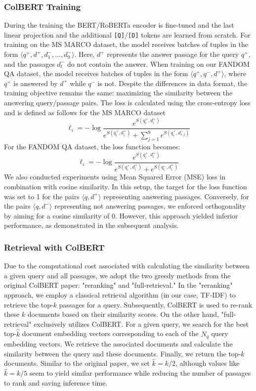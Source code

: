 \documentclass{article}
\begin{document}
\subsubsection{ColBERT Training}
During the training the BERT/RoBERTa encoder is fine-tuned and the last linear projection and the additional \texttt{[Q]}/\texttt{[D]} tokens are learned from scratch. For training on the MS MARCO dataset, the model receives batches of tuples in the form $\langle q^+, d^+, d_1^-, \dots, d_{9}^-\rangle$. Here, $d^+$ represents the answer passage for the query $q^+$, and the passages $d_l^-$ do not contain the answer. When training on our FANDOM QA dataset, the model receives batches of tuples in the form $\langle q^+, q^-, d^+\rangle$, where $q^+$ is answered by $d^+$ while $q^-$ is not. Despite the differences in data format, the training objective remains the same: maximizing the similarity between the answering query/passage pairs. The loss is calculated using the cross-entropy loss and is defined as follows for the MS MARCO dataset
$$
\ell_i = -\log \frac{e^{S(q_i^+, d_i^+)}}{e^{S(q_i^+, d_i^+)} + \sum_{j=1}^{9}{e^{S(q_i^+, d_{i, j}^-)}}}
$$
For the FANDOM QA dataset, the loss function becomes:
$$
\ell_i = -\log \frac{e^{S(q_i^+, d_i^+)}}{e^{S(q_i^+, d_i^+)} + e^{S(q_i^-, d_i^+)}}
$$
We also conducted experiments using Mean Squared Error (MSE) loss in combination with cosine similarity. In this setup, the target for the loss function was set to 1 for the pairs $\langle q, d^+\rangle$ representing answering passages. Conversely, for the pairs $\langle q, d^-\rangle$ representing not answering passages, we enforced orthogonality by aiming for a cosine similarity of 0. However, this approach yielded inferior performance, as demonstrated in the subsequent analysis.


\subsubsection{Retrieval with ColBERT}
Due to the computational cost associated with calculating the similarity between a given query and all passages, we adopt the two greedy methods from the original ColBERT paper: "reranking" and "full-retrieval." In the "reranking" approach, we employ a classical retrieval algorithm (in our case, TF-IDF) to retrieve the top-$k$ passages for a query. Subsequently, ColBERT is used to re-rank these $k$ documents based on their similarity scores. On the other hand, "full-retrieval" exclusively utilizes ColBERT. For a given query, we search for the best top-$\hat{k}$ document embedding vectors corresponding to each of the $N_q$ query embedding vectors. We retrieve the associated documents and calculate the similarity between the query and these documents. Finally, we return the top-$k$ documents. Similar to the original paper, we set $\hat{k} = k / 2$, although values like $\hat{k} = k / 5$ seem to yield similar performance while reducing the number of passages to rank and saving inference time.
\end{document}
